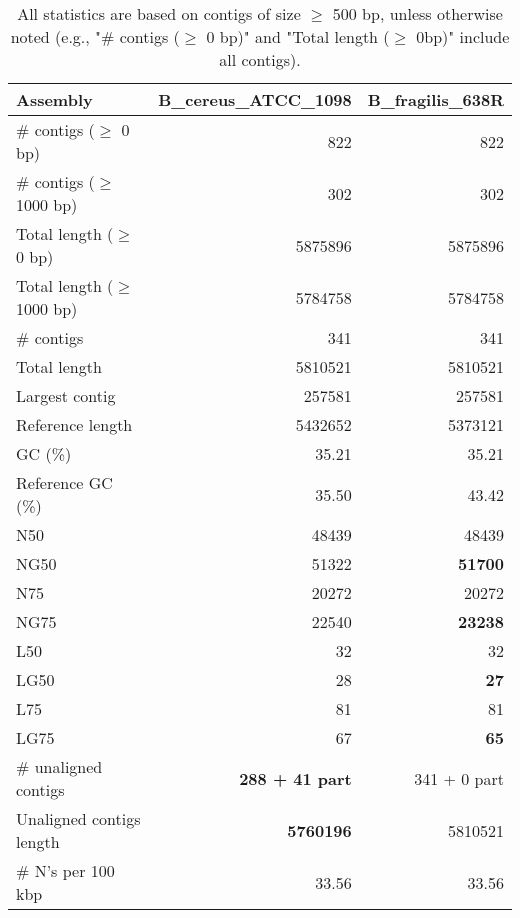 \documentclass[12pt,a4paper]{article}
\begin{document}
\begin{table}[ht]
\begin{center}
\caption{All statistics are based on contigs of size $\geq$ 500 bp, unless otherwise noted (e.g., "\# contigs ($\geq$ 0 bp)" and "Total length ($\geq$ 0bp)" include all contigs).}
\begin{tabular}{|l*{2}{|r}|}
\hline
Assembly & B\_cereus\_ATCC\_1098 & B\_fragilis\_638R \\ \hline
\# contigs ($\geq$ 0 bp) & 822 & 822 \\ \hline
\# contigs ($\geq$ 1000 bp) & 302 & 302 \\ \hline
Total length ($\geq$ 0 bp) & 5875896 & 5875896 \\ \hline
Total length ($\geq$ 1000 bp) & 5784758 & 5784758 \\ \hline
\# contigs & 341 & 341 \\ \hline
Total length & 5810521 & 5810521 \\ \hline
Largest contig & 257581 & 257581 \\ \hline
Reference length & 5432652 & 5373121 \\ \hline
GC (\%) & 35.21 & 35.21 \\ \hline
Reference GC (\%) & 35.50 & 43.42 \\ \hline
N50 & 48439 & 48439 \\ \hline
NG50 & 51322 & {\bf 51700} \\ \hline
N75 & 20272 & 20272 \\ \hline
NG75 & 22540 & {\bf 23238} \\ \hline
L50 & 32 & 32 \\ \hline
LG50 & 28 & {\bf 27} \\ \hline
L75 & 81 & 81 \\ \hline
LG75 & 67 & {\bf 65} \\ \hline
\# unaligned contigs & {\bf 288 + 41 part} & 341 + 0 part \\ \hline
Unaligned contigs length & {\bf 5760196} & 5810521 \\ \hline
\# N's per 100 kbp & 33.56 & 33.56 \\ \hline
\end{tabular}
\end{center}
\end{table}
\end{document}
